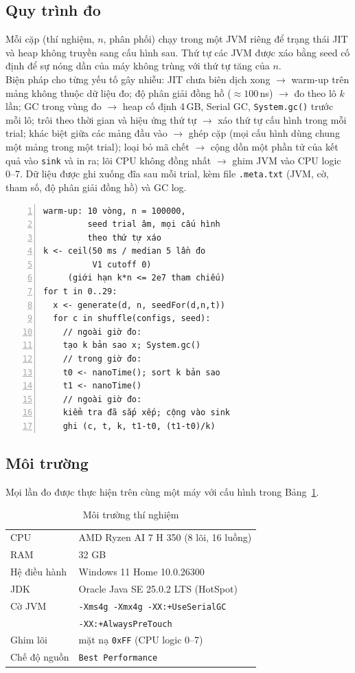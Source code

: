 \documentclass[11pt,a4paper]{article}
\begin{document}
\subsection{Quy trình đo}\label{sec:procedure}
Mỗi cặp (thí nghiệm, $n$, phân phối) chạy trong một JVM riêng để trạng thái JIT và heap không truyền sang
cấu hình sau. Thứ tự các JVM được xáo bằng seed cố định để sự nóng dần của máy không trùng với thứ tự tăng của $n$.\\
Biện pháp cho từng yếu tố gây nhiễu:
JIT chưa biên dịch xong $\to$ warm-up trên mảng không thuộc dữ liệu đo;
độ phân giải đồng hồ ($\approx 100$\,ns) $\to$ đo theo lô $k$ lần;
GC trong vùng đo $\to$ heap cố định 4\,GB, Serial GC, \texttt{System.gc()} trước mỗi lô;
trôi theo thời gian và hiệu ứng thứ tự $\to$ xáo thứ tự cấu hình trong mỗi trial;
khác biệt giữa các mảng đầu vào $\to$ ghép cặp (mọi cấu hình dùng chung một mảng trong một trial);
loại bỏ mã chết $\to$ cộng dồn một phần tử của kết quả vào \texttt{sink} và in ra;
lõi CPU không đồng nhất $\to$ ghim JVM vào CPU logic 0--7.
Dữ liệu được ghi xuống đĩa sau mỗi trial, kèm file \texttt{.meta.txt} (JVM, cờ, tham số, độ phân giải đồng hồ) và GC log.
\begin{Verbatim}[frame=single,numbers=left,numbersep=4pt,fontsize=\footnotesize,xleftmargin=1.5em]
warm-up: 10 vòng, n = 100000,
         seed trial âm, mọi cấu hình
         theo thứ tự xáo
k <- ceil(50 ms / median 5 lần đo
          V1 cutoff 0)
     (giới hạn k*n <= 2e7 tham chiếu)
for t in 0..29:
  x <- generate(d, n, seedFor(d,n,t))
  for c in shuffle(configs, seed):
    // ngoài giờ đo:
    tạo k bản sao x; System.gc()
    // trong giờ đo:
    t0 <- nanoTime(); sort k bản sao
    t1 <- nanoTime()
    // ngoài giờ đo:
    kiểm tra đã sắp xếp; cộng vào sink
    ghi (c, t, k, t1-t0, (t1-t0)/k)
\end{Verbatim}

\subsection{Môi trường}
Mọi lần đo được thực hiện trên cùng một máy với cấu hình trong Bảng~\ref{tab:env}.
\begin{table}[H]
\centering
\small
\begin{tabular}{ll}
\toprule
CPU & AMD Ryzen AI 7 H 350 (8 lõi, 16 luồng) \\
RAM & 32 GB \\
Hệ điều hành & Windows 11 Home 10.0.26300 \\
JDK & Oracle Java SE 25.0.2 LTS (HotSpot) \\
Cờ JVM & \texttt{-Xms4g -Xmx4g -XX:+UseSerialGC} \\
       & \texttt{-XX:+AlwaysPreTouch} \\
Ghim lõi & mặt nạ \texttt{0xFF} (CPU logic 0--7) \\
Chế độ nguồn & \texttt{Best Performance} \\
\bottomrule
\end{tabular}
\caption{Môi trường thí nghiệm}
\label{tab:env}
\end{table}
\end{document}
